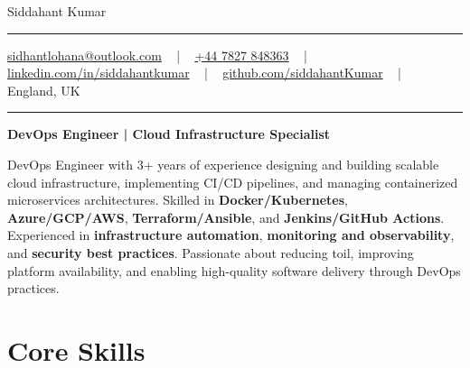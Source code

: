 \documentclass[letterpaper,10pt]{article}
\newcommand{\documentTitle}[2]{
  \begin{center}
    \vspace*{-0.3in}
    {\Huge\color{accentTitle} #1}
    \vspace{8pt}
    {\color{accentLine} \hrule}
    \vspace{2pt}
    \footnotesize{#2}
    \vspace{2pt}
    {\color{accentLine} \hrule}
  \end{center}
}
\begin{document}
\documentTitle{Siddahant Kumar}{
\vspace{0.1cm}
\href{mailto:sidhantlohana@outlook.com}{sidhantlohana@outlook.com} ~ | ~
\href{tel:+447827848363}{+44 7827 848363} ~ | ~
\href{https://www.linkedin.com/in/siddahantkumar/}{linkedin.com/in/siddahantkumar} ~ | ~
\href{https://github.com/siddahantKumar}{github.com/siddahantKumar} ~ | ~
England, UK
}

\begin{center}
\textbf{DevOps Engineer | Cloud Infrastructure Specialist}
\end{center}

DevOps Engineer with 3+ years of experience designing and building scalable cloud infrastructure, implementing CI/CD pipelines, and managing containerized microservices architectures. Skilled in \textbf{Docker/Kubernetes}, \textbf{Azure/GCP/AWS}, \textbf{Terraform/Ansible}, and \textbf{Jenkins/GitHub Actions}. Experienced in \textbf{infrastructure automation}, \textbf{monitoring and observability}, and \textbf{security best practices}. Passionate about reducing toil, improving platform availability, and enabling high-quality software delivery through DevOps practices.

\section{Core Skills}
\end{document}
